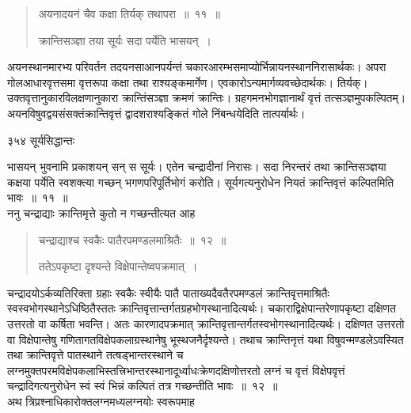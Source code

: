 \documentclass[11pt, openany]{book}
\begin{document}

\begin{quote}
{\ssi अयनादयनं चैव कक्षा तिर्यक् तथापरा~॥~११~॥
 
क्रान्तिसञ्ज्ञा तया सूर्यः सदा पर्येति भासयन्~। }
\end{quote}

 अयनस्थानमारभ्य परिवर्तन तदयनसाआनपर्यन्तं चकारआरम्भसमाप्योर्भिन्नायनस्थाननिरासार्थकः। अपरा गोलआधारवृत्तसमा वृत्तरूपा कक्षा तथा राश्यङ्कमार्गेण। एवकारोऽन्यमार्गव्यवच्छेदार्थकः। तिर्यक्। उक्तवृत्तानुकारविलक्षणानुकारा क्रान्तिंसञ्ज्ञा क्रमणं क्रान्तिः। ग्रहगमनभोगज्ञानार्थं वृत्तं तत्सञ्ज्ञमुपकल्पितम्। अयनविषुवद्वयसंसक्तंक्रान्तिवृत्तं द्वादशराश्यङ्कितं गोले निंबन्धयेदिति तात्पर्यार्थः।
%


\newpage


\noindent ३५४ \hspace{4cm} सूर्यसिद्धान्तः
\vspace{1cm}


\noindent भासयन् भुवनामि प्रकाशयन् सन् स सूर्यः। एतेन चन्द्रादीनां निरासः। सदा निरन्तरं तथा क्रान्तिसञ्ज्ञया कक्षया पर्येति स्वशक्त्या गच्छन् भगणपरिपूर्तिभोगं करोति। सूर्यगत्यनुरोधेन नियतं क्रान्तिवृत्तं कल्पितमिति भावः~॥~११~॥\\
\noindent ननु चन्द्राद्याः क्रान्तिमृत्ते कुतो न गच्छन्तीत्यत आह \textendash


\begin{quote}
{\ssi चन्द्राद्याश्च स्वकैः पातैरपमण्डलमाश्रितैः~॥~१२~॥ 
 
ततेऽपकृष्टा दृश्यन्ते विक्षेपान्तेष्वपक्रमात्~। }
\end{quote}

 चन्द्रादयोऽर्कव्यतिरिक्ता ग्रहाः स्वकैः स्वीयैः पातै  पाताख्यदैवतैरपमण्डलं क्रान्तिवृत्तमाश्रितैः स्वस्वभोगस्थानेऽधिष्ठितैस्ततः क्रान्तिवृत्तान्तर्गतग्रहभोगस्थानादित्यर्थः। चकाराद्विक्षेपान्तरेणापकृष्टा दक्षिणत उत्तरतो वा कर्षिता भवन्ति। अतः कारणादपक्रमात् क्रान्तिवृत्तान्तर्गतस्वभोगस्थानादित्यर्थः। दक्षिणत उत्तरतो वा विक्षेपान्तेषु गणितागतविक्षेपकलाग्रस्थानेषु भूस्थजनैर्दृश्यन्ते। तथाच क्रान्तिनृत्तं यथा विषुवन्मण्डलेऽवस्यित तथा क्रान्तिवृत्ते पातस्थाने तत्षड्भान्तरस्थाने च लग्नमुक्तपरमविक्षेपकलाभिस्तत्त्रिभान्तरस्थानादूर्ध्वाधःक्रेणदक्षिणोत्तरतो लग्नं च वृत्तं विक्षेपवृत्तं चन्द्रादिगत्यनुरोधेन स्वं स्वं भिन्नं कल्पितं तत्र गच्छन्तीति भावः~॥~१२~॥ \\
\noindent अथ त्रिप्रश्नाधिकारोक्तलग्नमध्यलग्नयोः स्वरूपमाह \textendash 
\end{document}
